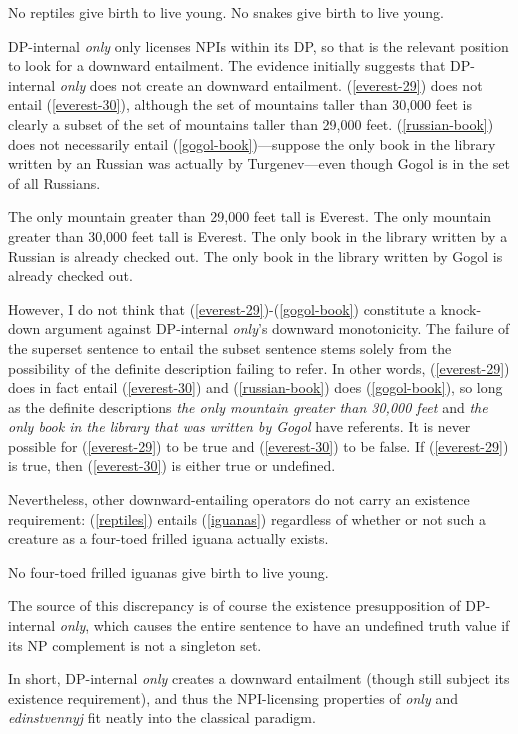 \begin{exe}
	\ex \label{reptiles} No reptiles give birth to live young.
	\ex \label{snakes} No snakes give birth to live young.
\end{exe}

DP-internal \textit{only} only licenses NPIs within its DP, so that is the relevant position to look for a downward entailment. The evidence initially suggests that DP-internal \textit{only} does not create an downward entailment. (\ref{everest-29}) does not entail (\ref{everest-30}), although the set of mountains taller than 30,000 feet is clearly a subset of the set of mountains taller than 29,000 feet. (\ref{russian-book}) does not necessarily entail (\ref{gogol-book})---suppose the only book in the library written by an Russian was actually by Turgenev---even though Gogol is in the set of all Russians.

\begin{exe}
	\ex \label{everest-29} The only mountain greater than 29,000 feet tall is Everest.
	\ex \label{everest-30} The only mountain greater than 30,000 feet tall is Everest.
	\ex \label{russian-book} The only book in the library written by a Russian is already checked out.
	\ex \label{gogol-book} The only book in the library written by Gogol is already checked out.
\end{exe}

However, I do not think that (\ref{everest-29})-(\ref{gogol-book}) constitute a knock-down argument against DP-internal \textit{only}'s downward monotonicity. The failure of the superset sentence to entail the subset sentence stems solely from the possibility of the definite description failing to refer. In other words, (\ref{everest-29}) does in fact entail (\ref{everest-30}) and (\ref{russian-book}) does (\ref{gogol-book}), so long as the definite descriptions \textit{the only mountain greater than 30,000 feet} and \textit{the only book in the library that was written by Gogol} have referents. It is never possible for (\ref{everest-29}) to be true and (\ref{everest-30}) to be false. If (\ref{everest-29}) is true, then (\ref{everest-30}) is either true or undefined.

Nevertheless, other downward-entailing operators do not carry an existence requirement: (\ref{reptiles}) entails (\ref{iguanas}) regardless of whether or not such a creature as a four-toed frilled iguana actually exists.

\begin{exe}
	\ex \label{iguanas} No four-toed frilled iguanas give birth to live young.
\end{exe}

The source of this discrepancy is of course the existence presupposition of DP-internal \textit{only}, which causes the entire sentence to have an undefined truth value if its NP complement is not a singleton set.

In short, DP-internal \textit{only} creates a downward entailment (though still subject its existence requirement), and thus the NPI-licensing properties of \textit{only} and \textit{edinstvennyj} fit neatly into the classical paradigm.
